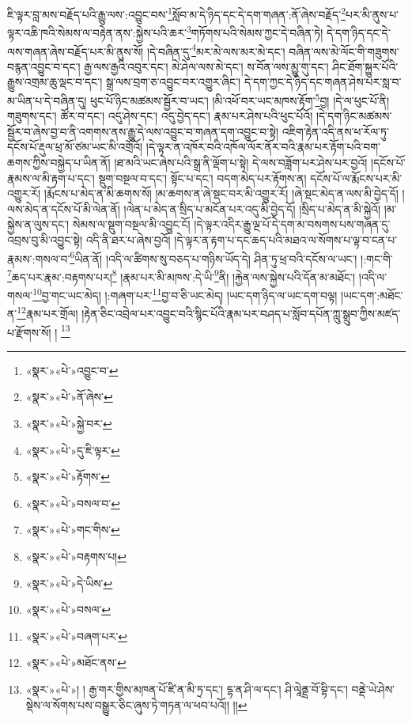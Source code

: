 ཇི་ལྟར་བླ་མས་བརྗོད་པའི་རྒྱུ་ལས་:འབྱུང་བས་\footnote{«སྣར་»«པེ་»འབྱུང་བ་}སློབ་མ་དེ་ཉིད་དང་དེ་དག་གཞན་:ནོ་ཞེས་བརྗོད་\footnote{«སྣར་»«པེ་»ནོ་ཞེས་}པར་མི་ནུས་པ་ལྟར་འཆི་ཁའི་སེམས་ལ་བརྟེན་ནས་:སྐྱེས་པའི་ཆར་\footnote{«སྣར་»«པེ་»སྐྱེ་བར་}གཏོགས་པའི་སེམས་ཀྱང་དེ་བཞིན་ཏེ། དེ་དག་ཉིད་དང་དེ་ལས་གཞན་ཞེས་བརྗོད་པར་མི་ནུས་སོ། །དེ་བཞིན་དུ་\footnote{«སྣར་»«པེ་»དུ་ཇི་ལྟར་}མར་མེ་ལས་མར་མེ་དང་། བཞིན་ལས་མེ་ལོང་གི་གཟུགས་བརྙན་འབྱུང་བ་དང་། རྒྱ་ལས་རྒྱའི་འབུར་དང་། མེ་ཤེལ་ལས་མེ་དང་། ས་བོན་ལས་མྱུ་གུ་དང་། ཤིང་ཐོག་སྐྱུར་པོའི་རྒྱུས་འགྲམ་ཆུ་ལྡང་བ་དང་། སྒྲ་ལས་བྲག་ཅ་འབྱུང་བར་འགྱུར་ཞིང་། དེ་དག་ཀྱང་དེ་ཉིད་དང་གཞན་ཤེས་པར་སླ་བ་མ་ཡིན་པ་དེ་བཞིན་དུ། ཕུང་པོ་ཉིང་མཚམས་སྦྱོར་བ་ཡང་། །མི་འཕོ་བར་ཡང་མཁས་རྟོག་\footnote{«སྣར་»«པེ་»རྟོགས་}བྱ། །དེ་ལ་ཕུང་པོ་ནི། གཟུགས་དང་། ཚོར་བ་དང་། འདུ་ཤེས་དང་། འདུ་བྱེད་དང་། རྣམ་པར་ཤེས་པའི་ཕུང་པོའོ། །དེ་དག་ཉིང་མཚམས་སྦྱོར་བ་ཞེས་བྱ་བ་ནི་འགགས་ནས་རྒྱུ་དེ་ལས་འབྱུང་བ་གཞན་དག་འབྱུང་བ་སྟེ། འཇིག་རྟེན་འདི་ནས་ཕ་རོལ་ཏུ་དངོས་པོ་རྡུལ་ཕྲ་མོ་ཙམ་ཡང་མི་འགྲོའོ། །དེ་ལྟར་ན་འཁོར་བའི་འཁོལ་ལོར་ནོར་བའི་རྣམ་པར་རྟོག་པའི་བག་ཆགས་ཀྱིས་བསྐྱེད་པ་ཡིན་ནོ། །ཐ་མའི་ཡང་ཞེས་པའི་སྒྲ་ནི་ལྡོག་པ་སྟེ། དེ་ལས་བཟློག་པར་ཤེས་པར་བྱའོ། །དངོས་པོ་རྣམས་ལ་མི་རྟག་པ་དང་། སྡུག་བསྔལ་བ་དང་། སྟོང་པ་དང་། བདག་མེད་པར་རྟོགས་ན། དངོས་པོ་ལ་རྨོངས་པར་མི་འགྱུར་རོ། །རྨོངས་པ་མེད་ན་མི་ཆགས་སོ། །མ་ཆགས་ན་ཞེ་སྡང་བར་མི་འགྱུར་རོ། །ཞེ་སྡང་མེད་ན་ལས་མི་བྱེད་དོ། །ལས་མེད་ན་དངོས་པོ་མི་ལེན་ནོ། །ལེན་པ་མེད་ན་སྲིད་པ་མངོན་པར་འདུ་མི་བྱེད་དོ། །སྲིད་པ་མེད་ན་མི་སྐྱེའོ། །མ་སྐྱེས་ན་ལུས་དང་། སེམས་ལ་སྡུག་བསྔལ་མི་འབྱུང་ངོ། །དེ་ལྟར་འདིར་རྒྱུ་ལྔ་པོ་དེ་དག་མ་བསགས་པས་གཞན་དུ་འབྲས་བུ་མི་འབྱུང་སྟེ། འདི་ནི་ཐར་པ་ཞེས་བྱའོ། །དེ་ལྟར་ན་རྟག་པ་དང་ཆད་པའི་མཐའ་ལ་སོགས་པ་ལྟ་བ་ངན་པ་རྣམས་:གསལ་བ་\footnote{«སྣར་»«པེ་»བསལ་བ་}ཡིན་ནོ། །འདི་ལ་ཚིགས་སུ་བཅད་པ་གཉིས་ཡོད་དེ། ཤིན་ཏུ་ཕྲ་བའི་དངོས་ལ་ཡང་། །:གང་གི་\footnote{«སྣར་»«པེ་»གང་གིས་}ཆད་པར་རྣམ་:བརྟགས་པར།\footnote{«སྣར་»«པེ་»བརྟགས་པ།} །རྣམ་པར་མི་མཁས་:དེ་ཡི་\footnote{«སྣར་»«པེ་»དེ་ཡིས་}ནི། །རྐྱེན་ལས་སྐྱེས་པའི་དོན་མ་མཐོང་། །འདི་ལ་གསལ་\footnote{«སྣར་»«པེ་»བསལ་}བྱ་གང་ཡང་མེད། །:གཞག་པར་\footnote{«སྣར་»«པེ་»བཞག་པར་}བྱ་བ་ཅི་ཡང་མེད། །ཡང་དག་ཉིད་ལ་ཡང་དག་བལྟ། །ཡང་དག་:མཐོང་ན་\footnote{«སྣར་»«པེ་»མཐོང་ནས་}རྣམ་པར་གྲོལ། །རྟེན་ཅིང་འབྲེལ་པར་འབྱུང་བའི་སྙིང་པོའི་རྣམ་པར་བཤད་པ་སློབ་དཔོན་ཀླུ་སྒྲུབ་ཀྱིས་མཛད་པ་རྫོགས་སོ། ། \footnote{«སྣར་»«པེ་»། ། རྒྱ་གར་གྱིས་མཁན་པོ་ཛི་ན་མི་ཏྲ་དང་། དྷ་ན་ཤི་ལ་དང་། ཤི་ལཱེནྡྲ་བོ་བྷི་དང་། བནྡེ་ཡེ་ཤེས་སྡེས་ལ་སོགས་པས་བསྒྱུར་ཅིང་ཞུས་ཏེ་གཏན་ལ་ཕབ་པའོ།། །།}
